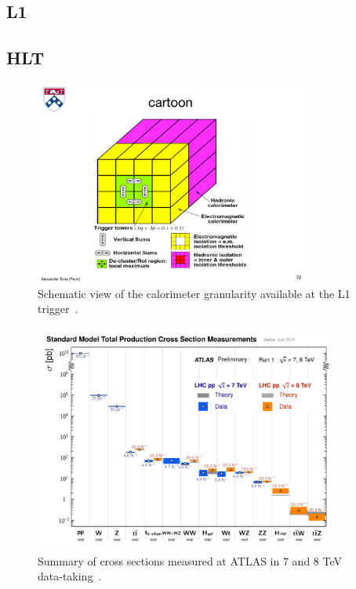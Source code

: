 \subsection{L1}
\subsection{HLT}


\begin{figure}[tp]
  \centering
  \includegraphics[width=0.80\textwidth]{figures/trigger/cartoonL1}
  \caption{Schematic view of the calorimeter granularity available at the L1 trigger~\cite{1998.ATLAS-TDR-L1}.}
  \label{fig:prospects-trigger-cartoonL1}
\end{figure}

\begin{figure}[tp]
  \centering
  \includegraphics[width=0.90\textwidth]{figures/lhc-atlas/ATLAS_a_SMSummary_TotalXsect}
  \caption{Summary of cross sections measured at ATLAS in 7 and 8 TeV data-taking~\cite{2015.atlas-summary-SM}.}
  \label{fig:atlas-measurements}
\end{figure}


